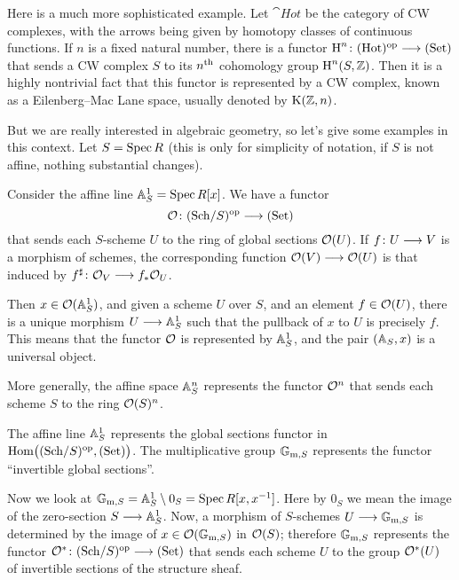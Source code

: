 \begin{2   CONTRAVARIANT FUNCTORS}
\begin{2.1 Yoneda Lemma}
\begin{enumeratei}
\item Here is a much more sophisticated example. Let $\cat{Hot}$ be the category of CW complexes, with the arrows being given by homotopy classes of continuous functions. If $n$ is a fixed natural number, there is a functor $\H^n \colon \cat{Hot}\op \arr \catset$ that sends a CW complex $S$ to its $n\th$ cohomology group $\H^n(S, \ZZ)$. Then it is a highly nontrivial fact that this functor is represented by a CW complex, known as a Eilenberg--Mac Lane space, usually denoted by $\rK( \ZZ, n)$.

\end{enumeratei}

But we are really interested in algebraic geometry, so let's give some examples in this context. Let $S = \spec R$ (this is only for simplicity of notation, if $S$ is not affine, nothing substantial changes).

\begin{example}\label{ex:affinespace} Consider the affine line $\AA^1_S = \spec R[x]$. We have a functor
   \[
   \cO\colon \catsch{S}\op \arr \catset
   \]
that sends each $S$-scheme $U$ to the ring of global sections $\cO(U)$. If $f\colon U \arr V$ is a morphism of schemes, the corresponding function $\cO(V) \arr \cO(U)$ is that induced by $f^{\sharp}\colon \cO_{V} \arr f_{*}\cO_{U}$.

Then $x \in \cO(\AA^1_S)$, and given a scheme $U$ over $S$, and an element $f \in \cO(U)$, there is a unique morphism $U \arr \AA^1_S$ such that the pullback of $x$ to $U$ is precisely $f$. This means that the functor $\cO$ is represented by $\AA^1_S$, and the pair $(\AA_S, x)$ is a universal object.

More generally, the affine space $\AA^n_S$ represents the functor $\cO^n$ that sends each scheme $S$ to the ring $\cO(S)^n$.
\end{example}
\begin{shaded}
The affine line $\AA^1_S$ represents the global sections functor in $\func{\catsch{S}}$. The multiplicative group $\gm$ represents the functor ``invertible global sections''.
\end{shaded}
\begin{example}
Now we look at $\gm = \AA^1_S \setminus 0_{S} = \spec R[x, x^{-1}]$. Here by $0_S$ we mean the image of the zero-section $S \arr \AA^1_S$. Now, a morphism of $S$-schemes $U \arr \gm$ is determined by the image of $x \in \cO(\gm)$ in $\cO(S)$; therefore $\gm$ represents the functor $\cO^*\colon \catsch{S}\op \arr \catset$ that sends each scheme $U$ to the group $\cO^*(U)$ of invertible sections of the structure sheaf.
\end{example}


\end{2.1 Yoneda Lemma}
\end{2   CONTRAVARIANT FUNCTORS}
